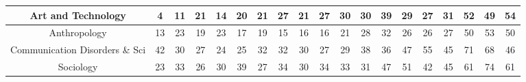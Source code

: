 \documentclass[10pt]{article}
\begin{document}
\begin{landscape}
\begin{longtable}[c]{|ccccccccccccccccccc|}
	\multicolumn{1}{|c|}{Art and Technology}                         & \multicolumn{1}{c|}{4}          & \multicolumn{1}{c|}{11}         & \multicolumn{1}{c|}{21}         & \multicolumn{1}{c|}{14}         & \multicolumn{1}{c|}{20}         & \multicolumn{1}{c|}{21}         & \multicolumn{1}{c|}{27}         & \multicolumn{1}{c|}{21}         & \multicolumn{1}{c|}{27}         & \multicolumn{1}{c|}{30}         & \multicolumn{1}{c|}{30}         & \multicolumn{1}{c|}{39}         & \multicolumn{1}{c|}{29}         & \multicolumn{1}{c|}{27}         & \multicolumn{1}{c|}{31}         & \multicolumn{1}{c|}{52}         & \multicolumn{1}{c|}{49}         & 54         \\ \hline
	\multicolumn{1}{|c|}{Anthropology}                               & \multicolumn{1}{c|}{13}         & \multicolumn{1}{c|}{23}         & \multicolumn{1}{c|}{19}         & \multicolumn{1}{c|}{23}         & \multicolumn{1}{c|}{17}         & \multicolumn{1}{c|}{19}         & \multicolumn{1}{c|}{15}         & \multicolumn{1}{c|}{16}         & \multicolumn{1}{c|}{16}         & \multicolumn{1}{c|}{21}         & \multicolumn{1}{c|}{28}         & \multicolumn{1}{c|}{32}         & \multicolumn{1}{c|}{26}         & \multicolumn{1}{c|}{26}         & \multicolumn{1}{c|}{27}         & \multicolumn{1}{c|}{50}         & \multicolumn{1}{c|}{53}         & 50         \\ \hline
	\multicolumn{1}{|c|}{Communication Disorders \& Sci}             & \multicolumn{1}{c|}{42}         & \multicolumn{1}{c|}{30}         & \multicolumn{1}{c|}{27}         & \multicolumn{1}{c|}{24}         & \multicolumn{1}{c|}{25}         & \multicolumn{1}{c|}{32}         & \multicolumn{1}{c|}{32}         & \multicolumn{1}{c|}{30}         & \multicolumn{1}{c|}{27}         & \multicolumn{1}{c|}{29}         & \multicolumn{1}{c|}{38}         & \multicolumn{1}{c|}{36}         & \multicolumn{1}{c|}{47}         & \multicolumn{1}{c|}{55}         & \multicolumn{1}{c|}{45}         & \multicolumn{1}{c|}{71}         & \multicolumn{1}{c|}{68}         & 46         \\ \hline
	\multicolumn{1}{|c|}{Sociology}                                  & \multicolumn{1}{c|}{23}         & \multicolumn{1}{c|}{33}         & \multicolumn{1}{c|}{26}         & \multicolumn{1}{c|}{30}         & \multicolumn{1}{c|}{39}         & \multicolumn{1}{c|}{27}         & \multicolumn{1}{c|}{34}         & \multicolumn{1}{c|}{30}         & \multicolumn{1}{c|}{34}         & \multicolumn{1}{c|}{33}         & \multicolumn{1}{c|}{31}         & \multicolumn{1}{c|}{47}         & \multicolumn{1}{c|}{51}         & \multicolumn{1}{c|}{42}         & \multicolumn{1}{c|}{45}         & \multicolumn{1}{c|}{61}         & \multicolumn{1}{c|}{74}         & 61         \\ \hline

\end{longtable}
\end{landscape}
\end{document}
